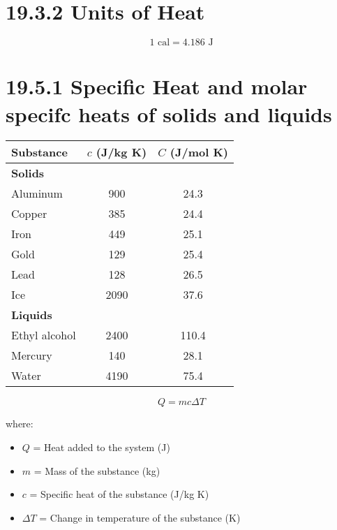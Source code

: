 \documentclass{article}
\begin{document}
\section*{19.3.2 Units of Heat}

\begin{equation}
    1 \text{ cal} = 4.186 \text{ J}
\end{equation}


\vspace{2cm}




\begin{table}[h]
    \centering
    \section*{19.5.1 Specific Heat and molar specifc heats of solids and liquids}
    \begin{tabular}{lcc}
        \toprule
        \textbf{Substance} & \textbf{$c$ (J/kg K)} & \textbf{$C$ (J/mol K)} \\
        \midrule
        \multicolumn{3}{l}{\textbf{Solids}} \\
        Aluminum  & 900  & 24.3 \\
        Copper    & 385  & 24.4 \\
        Iron      & 449  & 25.1 \\
        Gold      & 129  & 25.4 \\
        Lead      & 128  & 26.5 \\
        Ice       & 2090 & 37.6 \\
        \midrule
        \multicolumn{3}{l}{\textbf{Liquids}} \\
        Ethyl alcohol & 2400 & 110.4 \\
        Mercury       & 140  & 28.1 \\
        Water         & 4190 & 75.4 \\
        \bottomrule
    \end{tabular}
\end{table}

\vspace{2cm}


\begin{equation}
    Q = mc \Delta T
\end{equation}

where:
\begin{itemize}
    \item $Q$ = Heat added to the system (J)
    \item $m$ = Mass of the substance (kg)
    \item $c$ = Specific heat of the substance (J/kg K)
    \item $\Delta T$ = Change in temperature of the substance (K)
\end{itemize}
\end{document}

